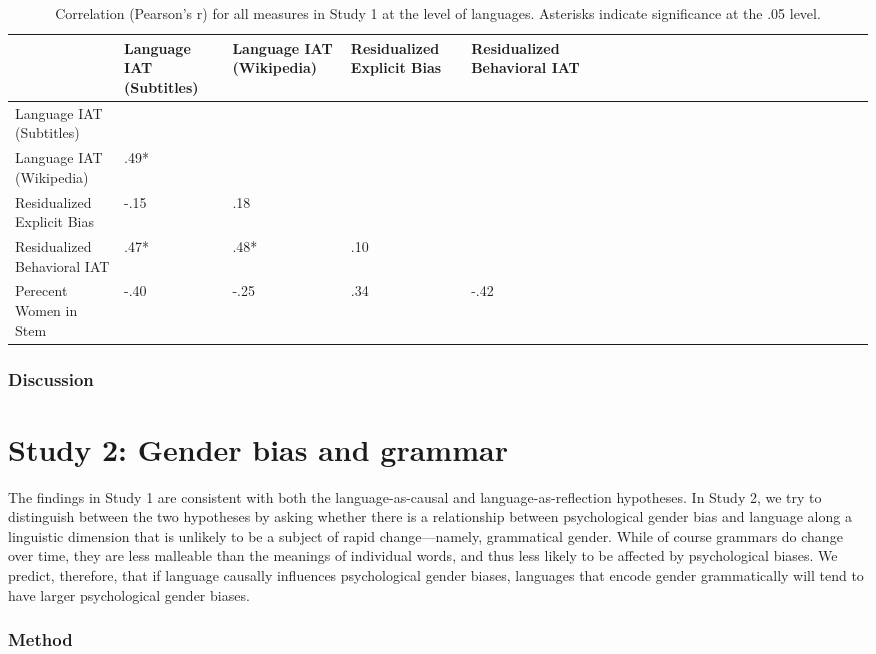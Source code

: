 \documentclass[man,floatsintext]{apa6}
\theoremstyle{definition}
\theoremstyle{definition}
\theoremstyle{definition}
\theoremstyle{remark}
\begin{document}
\begin{table}

\caption{\label{tab:corrtable}Correlation (Pearson's r) for all measures in Study 1 at the level of languages. Asterisks indicate significance at the .05 level.}
\centering
\fontsize{10}{12}\selectfont
\begin{tabular}[t]{l>{\raggedleft\arraybackslash}p{2.5cm}>{\raggedleft\arraybackslash}p{2.5cm}>{\raggedleft\arraybackslash}p{2.5cm}>{\raggedleft\arraybackslash}p{2.5cm}lrrrrlrrrrlrrrrlrrrr}
\toprule
 & Language IAT
(Subtitles) & Language IAT 
 (Wikipedia) & Residualized 
Explicit Bias & Residualized 
Behavioral IAT\\
\midrule
Language IAT (Subtitles) &  &  &  & \\
Language IAT (Wikipedia) & .49* &  &  & \\
Residualized Explicit Bias & -.15 & .18 &  & \\
Residualized Behavioral IAT & .47* & .48* & .10 & \\
Perecent Women in Stem & -.40 & -.25 & .34 & -.42\\
\bottomrule
\end{tabular}
\end{table}

\subsubsection{Discussion}\label{discussion}

\section{Study 2: Gender bias and
grammar}\label{study-2-gender-bias-and-grammar}

The findings in Study 1 are consistent with both the language-as-causal
and language-as-reflection hypotheses. In Study 2, we try to distinguish
between the two hypotheses by asking whether there is a relationship
between psychological gender bias and language along a linguistic
dimension that is unlikely to be a subject of rapid change---namely,
grammatical gender. While of course grammars do change over time, they
are less malleable than the meanings of individual words, and thus less
likely to be affected by psychological biases. We predict, therefore,
that if language causally influences psychological gender biases,
languages that encode gender grammatically will tend to have larger
psychological gender biases.

\subsubsection{Method}\label{method}
\end{document}
